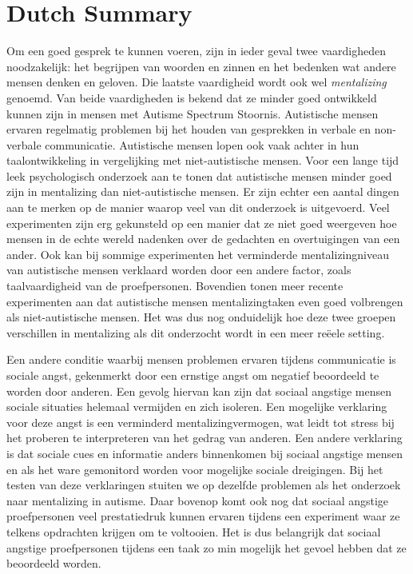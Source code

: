 \chapter*{Dutch Summary}
\label{ch:dutchsummary}


Om een goed gesprek te kunnen voeren, zijn in ieder geval twee vaardigheden noodzakelijk: het begrijpen van woorden en zinnen en het bedenken wat andere mensen denken en geloven. Die laatste vaardigheid wordt ook wel \emph{mentalizing} genoemd. Van beide vaardigheden is bekend dat ze minder goed ontwikkeld kunnen zijn in mensen met Autisme Spectrum Stoornis. Autistische mensen ervaren regelmatig problemen bij het houden van gesprekken in verbale en non-verbale communicatie. Autistische mensen lopen ook vaak achter in hun taalontwikkeling in vergelijking met niet-autistische mensen. Voor een lange tijd leek psychologisch onderzoek aan te tonen dat autistische mensen minder goed zijn in mentalizing dan niet-autistische mensen. Er zijn echter een aantal dingen aan te merken op de manier waarop veel van dit onderzoek is uitgevoerd. Veel experimenten zijn erg gekunsteld op een manier dat ze niet goed weergeven hoe mensen in de echte wereld nadenken over de gedachten en overtuigingen van een ander. Ook kan bij sommige experimenten het verminderde mentalizingniveau van autistische mensen verklaard worden door een andere factor, zoals taalvaardigheid van de proefpersonen. Bovendien tonen meer recente experimenten aan dat autistische mensen mentalizingtaken even goed volbrengen als niet-autistische mensen. Het was dus nog onduidelijk hoe deze twee groepen verschillen in mentalizing als dit onderzocht wordt in een meer re\"eele setting.

Een andere conditie waarbij mensen problemen ervaren tijdens communicatie is sociale angst, gekenmerkt door een ernstige angst om negatief beoordeeld te worden door anderen. Een gevolg hiervan kan zijn dat sociaal angstige mensen sociale situaties helemaal vermijden en zich isoleren. Een mogelijke verklaring voor deze angst is een verminderd mentalizingvermogen, wat leidt tot stress bij het proberen te interpreteren van het gedrag van anderen. Een andere verklaring is dat sociale cues en informatie anders binnenkomen bij sociaal angstige mensen en als het ware gemonitord worden voor mogelijke sociale dreigingen. Bij het testen van deze verklaringen stuiten we op dezelfde problemen als het onderzoek naar mentalizing in autisme. Daar bovenop komt ook nog dat sociaal angstige proefpersonen veel prestatiedruk kunnen ervaren tijdens een experiment waar ze telkens opdrachten krijgen om te voltooien. Het is dus belangrijk dat sociaal angstige proefpersonen tijdens een taak zo min mogelijk het gevoel hebben dat ze beoordeeld worden.

